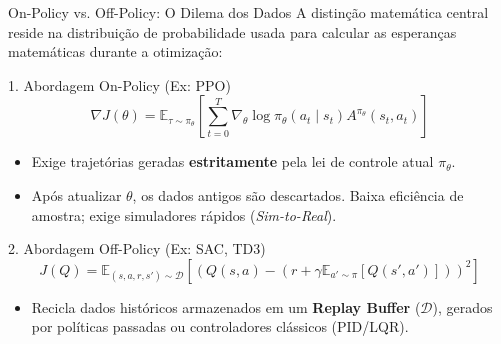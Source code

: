 \documentclass[11pt, aspectratio=169]{beamer}
\begin{document}
\begin{frame}{On-Policy vs. Off-Policy: O Dilema dos Dados}
    A distinção matemática central reside na distribuição de probabilidade usada para calcular as esperanças matemáticas durante a otimização:
    
    \vspace{0.2cm}
    \begin{block}{1. Abordagem On-Policy (Ex: PPO)}
        \[ \nabla J(\theta) = \mathbb{E}_{\tau \sim \pi_\theta} \left[ \sum_{t=0}^T \nabla_\theta \log \pi_\theta(a_t \mid s_t) A^{\pi_\theta}(s_t, a_t) \right] \]
        \begin{itemize}
            \item Exige trajetórias geradas \textbf{estritamente} pela lei de controle atual $\pi_\theta$.
            \item Após atualizar $\theta$, os dados antigos são descartados. Baixa eficiência de amostra; exige simuladores rápidos (\textit{Sim-to-Real}).
        \end{itemize}
    \end{block}
    
    \begin{block}{2. Abordagem Off-Policy (Ex: SAC, TD3)}
        \[ J(Q) = \mathbb{E}_{(s,a,r,s') \sim \mathcal{D}} \left[ \left( Q(s,a) - \left( r + \gamma \mathbb{E}_{a' \sim \pi}[Q(s',a')] \right) \right)^2 \right] \]
        \begin{itemize}
            \item Recicla dados históricos armazenados em um \textbf{Replay Buffer} ($\mathcal{D}$), gerados por políticas passadas ou controladores clássicos (PID/LQR).
        \end{itemize}
    \end{block}
\end{frame}
\end{document}
